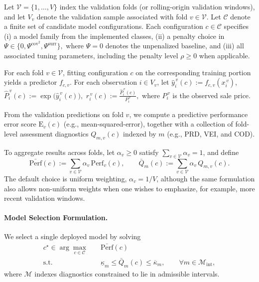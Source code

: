 \documentclass{article}
\theoremstyle{plain}
\theoremstyle{definition}
\newcommand{\1}{\mathbf{1}}
\begin{document}
Let $\mathcal V=\{1,\dots,V\}$ index the validation folds (or rolling-origin validation windows), and let $V_v$ denote the validation sample associated with fold $v\in\mathcal V$. Let $\mathcal C$ denote a finite set of candidate model configurations. Each configuration $c\in\mathcal C$ specifies
(i) a model family from the implemented classes,
(ii) a penalty choice in
$
\Psi \in \{0,\Psi^{\mathrm{cov}^2},\Psi^{\mathrm{surr}}\},
$
where $\Psi=0$ denotes the unpenalized baseline,
and
(iii) all associated tuning parameters, including the penalty level $\rho\ge 0$ when applicable.

For each fold $v\in\mathcal V$, fitting configuration $c$ on the corresponding training portion yields a predictor $f_{c,v}$. For each observation $i\in V_v$, let
$
\hat y_i^{\,v}(c):=f_{c,v}(x_i^{\,v})$, $
\hat P_i^{\,v}(c):=\exp\!\bigl(\hat y_i^{\,v}(c)\bigr),$
$r_i^{\,v}(c):=\frac{\hat P_i^{\,v}(c)}{P_i^{\,v}},
$
where $P_i^{\,v}$ is the observed sale price. 

From the validation predictions on fold $v$, we compute a predictive performance error score $\mathrm{E}_v(c)$ (e.g., mean-squared-error), together with a collection of fold-level assessment diagnostics $Q_{m,v}(c)$ indexed by $m$ (e.g., PRD, VEI, and COD). 


To aggregate results across folds, let $\alpha_v\ge 0$ satisfy $\sum_{v\in\mathcal V}\alpha_v=1$, and define
\[
\bar{\mathrm{Perf}}(c):=\sum_{v\in\mathcal V}\alpha_v\,\mathrm{Perf}_v(c),
\qquad
\bar Q_m(c):=\sum_{v\in\mathcal V}\alpha_v\,Q_{m,v}(c).
\]
The default choice is uniform weighting, $\alpha_v=1/V$, although the same formulation also allows non-uniform weights when one wishes to emphasize, for example, more recent validation windows.


\paragraph{Model Selection Formulation.} 
We select a single deployed model by solving
\begin{align}
    \label{opt:model_selection_single}
    c^\star
    \in
    \arg\max_{c\in\mathcal C}
    \quad
    & \bar{\mathrm{Perf}}(c)
    \\
    \text{s.t.}\quad
    & \underline{\kappa}_m \le \bar Q_m(c) \le \overline{\kappa}_m,
    \qquad \forall m\in\mathcal M_{\mathrm{int}},
    \nonumber
\end{align}
where $\mathcal M$ indexes diagnostics constrained to lie in admissible intervals.
\end{document}
